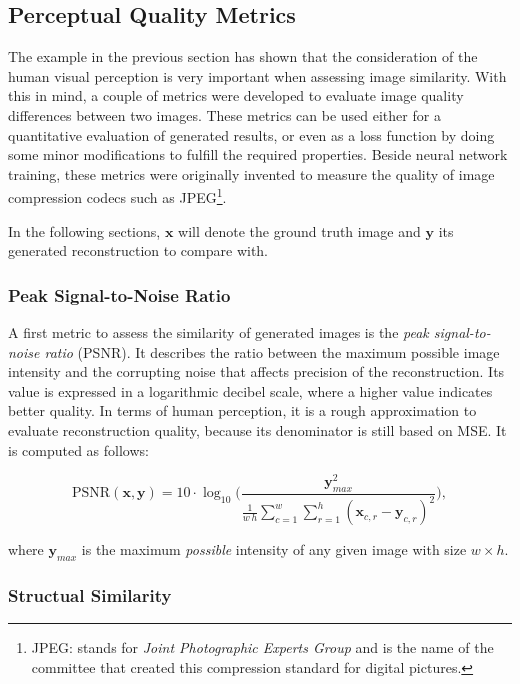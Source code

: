 \subsection{Perceptual Quality Metrics} \label{sec:img_metrics}

The example in the previous section has shown that the consideration of the human visual perception is very important when assessing image similarity. With this in mind, a couple of metrics were developed to evaluate image quality differences between two images. These metrics can be used either for a quantitative evaluation of generated results, or even as a loss function by doing some minor modifications to fulfill the required properties. Beside neural network training, these metrics were originally invented to measure the quality of image compression codecs such as JPEG\footnote{JPEG: stands for \textit{Joint Photographic Experts Group} and is the name of the committee that created this compression standard for digital pictures.}.

In the following sections, $ \textbf{x} $ will denote the ground truth image and $ \textbf{y} $ its generated reconstruction to compare with.

\subsubsection*{Peak Signal-to-Noise Ratio}

A first metric to assess the similarity of generated images is the \textit{peak signal-to-noise ratio} (PSNR). It describes the ratio between the maximum possible image intensity and the corrupting noise that affects precision of the reconstruction. Its value is expressed in a logarithmic decibel scale, where a higher value indicates better quality. In terms of human perception, it is a rough approximation to evaluate reconstruction quality, because its denominator is still based on MSE. It is computed as follows:

\begin{equation} \label{eq:psnr}
\textrm{PSNR}(\textbf{x}, \textbf{y}) = 10 \cdot \log_{10} \Bigg( \frac{\textbf{y}_{max}^2}{\frac{1}{w \, h} \sum_{c=1}^{w} \sum_{r=1}^{h} (\textbf{x}_{c,r} - \textbf{y}_{c,r})^2 } \Bigg) ,
\end{equation}

where $ \textbf{y}_{max} $ is the maximum \textit{possible} intensity of any given image with size $ w \times h $.


\subsubsection*{Structual Similarity}

